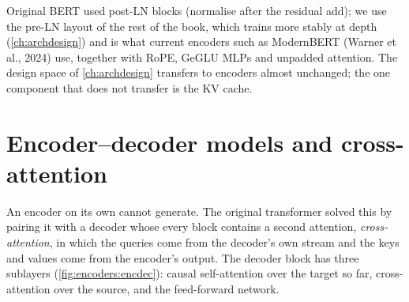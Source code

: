 Original BERT used post-LN blocks (normalise after the residual add); we use the pre-LN layout of the
rest of the book, which trains more stably at depth (\cref{ch:archdesign}) and is what current
encoders such as ModernBERT (Warner et al., 2024) use, together with RoPE, GeGLU MLPs and
unpadded attention. The design space of \cref{ch:archdesign} transfers to encoders almost
unchanged; the one component that does not transfer is the KV cache.

\section{Encoder--decoder models and cross-attention}\label{sec:encoders:crossattn}

An encoder on its own cannot generate. The original transformer solved this by pairing it with a
decoder whose every block contains a second attention, \emph{cross-attention}, in which the queries
come from the decoder's own stream and the keys and values come from the encoder's output. The
decoder block has three sublayers (\cref{fig:encoders:encdec}): causal self-attention over the target
so far, cross-attention over the source, and the feed-forward network.

